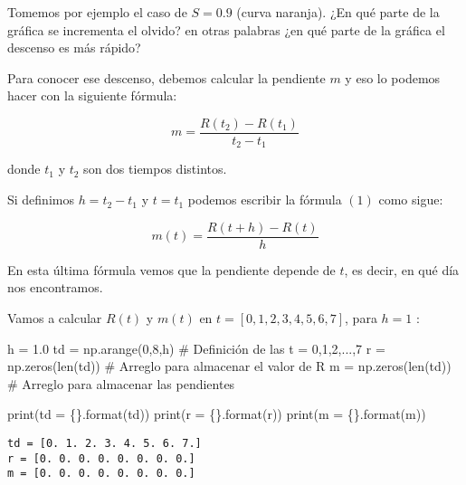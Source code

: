 \documentclass[
  letterpaper,
  DIV=11,
  numbers=noendperiod]{scrreprt}
\newenvironment{Shaded}{\begin{snugshade}}{\end{snugshade}}
\newcommand{\BuiltInTok}[1]{\textcolor[rgb]{0.00,0.23,0.31}{#1}}
\newcommand{\CommentTok}[1]{\textcolor[rgb]{0.37,0.37,0.37}{#1}}
\newcommand{\DecValTok}[1]{\textcolor[rgb]{0.68,0.00,0.00}{#1}}
\newcommand{\FloatTok}[1]{\textcolor[rgb]{0.68,0.00,0.00}{#1}}
\newcommand{\NormalTok}[1]{\textcolor[rgb]{0.00,0.23,0.31}{#1}}
\newcommand{\OperatorTok}[1]{\textcolor[rgb]{0.37,0.37,0.37}{#1}}
\newcommand{\SpecialCharTok}[1]{\textcolor[rgb]{0.37,0.37,0.37}{#1}}
\newcommand{\StringTok}[1]{\textcolor[rgb]{0.13,0.47,0.30}{#1}}
\begin{document}
Tomemos por ejemplo el caso de \(S=0.9\) (curva naranja). ¿En qué parte
de la gráfica se incrementa el olvido? en otras palabras ¿en qué parte
de la gráfica el descenso es más rápido?

Para conocer ese descenso, debemos calcular la pendiente \(m\) y eso lo
podemos hacer con la siguiente fórmula:

\[
m = \frac{R(t_2) - R(t_1)}{t_2 - t_1} \tag{1}
\]

donde \(t_1\) y \(t_2\) son dos tiempos distintos.

Si definimos \(h = t_2 - t_1\) y \(t = t_1\) podemos escribir la fórmula
\((1)\) como sigue:

\[
m(t) = \frac{R(t + h) - R(t)}{h} \tag{2}
\]

En esta última fórmula vemos que la pendiente depende de \(t\), es
decir, en qué día nos encontramos.

Vamos a calcular \(R(t)\) y \(m(t)\) en \(t = [0,1,2,3,4,5,6,7]\), para
\(h = 1\) :

\begin{Shaded}
\begin{Highlighting}[]
\NormalTok{h }\OperatorTok{=} \FloatTok{1.0}
\NormalTok{td }\OperatorTok{=}\NormalTok{ np.arange(}\DecValTok{0}\NormalTok{,}\DecValTok{8}\NormalTok{,h) }\CommentTok{\# Definición de las t = 0,1,2,...,7}
\NormalTok{r }\OperatorTok{=}\NormalTok{ np.zeros(}\BuiltInTok{len}\NormalTok{(td)) }\CommentTok{\# Arreglo para almacenar el valor de R}
\NormalTok{m }\OperatorTok{=}\NormalTok{ np.zeros(}\BuiltInTok{len}\NormalTok{(td)) }\CommentTok{\# Arreglo para almacenar las pendientes}

\BuiltInTok{print}\NormalTok{(}\StringTok{\textquotesingle{}td = }\SpecialCharTok{\{\}}\StringTok{\textquotesingle{}}\NormalTok{.}\BuiltInTok{format}\NormalTok{(td))}
\BuiltInTok{print}\NormalTok{(}\StringTok{\textquotesingle{}r = }\SpecialCharTok{\{\}}\StringTok{\textquotesingle{}}\NormalTok{.}\BuiltInTok{format}\NormalTok{(r))}
\BuiltInTok{print}\NormalTok{(}\StringTok{\textquotesingle{}m = }\SpecialCharTok{\{\}}\StringTok{\textquotesingle{}}\NormalTok{.}\BuiltInTok{format}\NormalTok{(m))}
\end{Highlighting}
\end{Shaded}

\begin{verbatim}
td = [0. 1. 2. 3. 4. 5. 6. 7.]
r = [0. 0. 0. 0. 0. 0. 0. 0.]
m = [0. 0. 0. 0. 0. 0. 0. 0.]
\end{verbatim}
\end{document}
